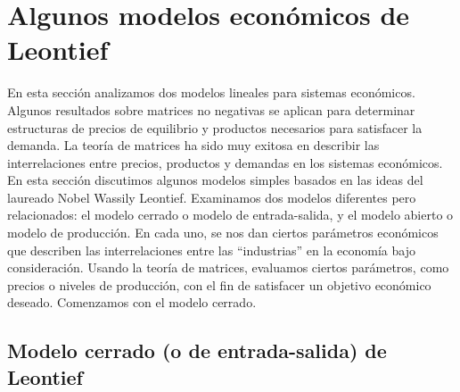 \section{Algunos modelos económicos de Leontief}

En esta sección analizamos dos modelos lineales para sistemas económicos. Algunos resultados sobre matrices no negativas se aplican para determinar estructuras de precios de equilibrio y productos necesarios para satisfacer la demanda. La teoría de matrices ha sido muy exitosa en describir las interrelaciones entre precios, productos y demandas en los sistemas económicos. En esta sección discutimos algunos modelos simples basados en las ideas del laureado Nobel Wassily Leontief. Examinamos dos modelos diferentes pero relacionados: el modelo cerrado o modelo de entrada-salida, y el modelo abierto o modelo de producción. En cada uno, se nos dan ciertos parámetros económicos que describen las interrelaciones entre las “industrias” en la economía bajo consideración. Usando la teoría de matrices, evaluamos ciertos parámetros, como precios o niveles de producción, con el fin de satisfacer un objetivo económico deseado. Comenzamos con el modelo cerrado.

\subsection*{Modelo cerrado (o de entrada-salida) de Leontief}

